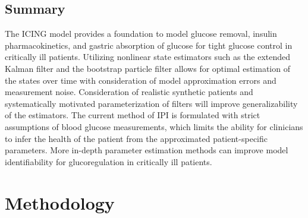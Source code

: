 \documentclass[nomenclature, english, bibtex]{kththesis}
\newcommand*{\engExpl}[1]{\todo[inline, backgroundcolor=kth-lightgreen40]{#1}} %
\newcommand*{\sweExpl}[1]{\todo[inline, backgroundcolor=kth-lightblue40]{#1}}  %
\begin{document}
\section{Summary}


The \gls{ICING} model provides a foundation to model glucose removal, insulin pharmacokinetics, and gastric absorption of glucose for tight glucose control in critically ill patients. Utilizing nonlinear state estimators such as the extended Kalman filter and the bootstrap particle filter allows for optimal estimation of the states over time with consideration of model approximation errors and measurement noise. Consideration of realistic synthetic patients and systematically motivated parameterization of filters will improve generalizability of the estimators. The current method of \gls{IPI} is formulated with strict assumptions of blood glucose measurements, which limits the ability for clinicians to infer the health of the patient from the approximated patient-specific parameters. More in-depth parameter estimation methods can improve model identifiability for glucoregulation in critically ill patients.

\cleardoublepage
\chapter{Methodology}
\label{ch:methodology}

\end{document}
